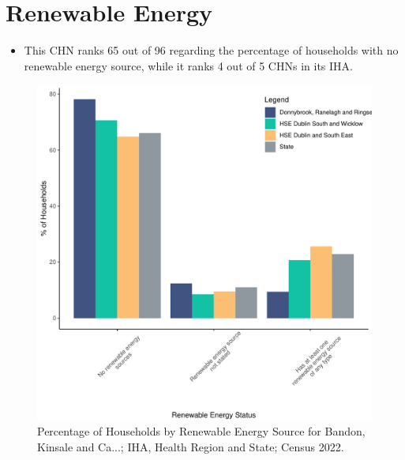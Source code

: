\documentclass{article}
\begin{document}
\section{Renewable Energy}\label{sect:RE}
\begin{itemize}
\item This CHN ranks  65 out of 96 regarding the percentage of households with no renewable energy source, while it ranks   4 out of 5 CHNs in its IHA.
\end{itemize}
\begin{figure}[H]
	\centering
	\includegraphics[width = 140mm]{../figures/RenewableEnergyED.pdf}
	\caption{Percentage of Households by Renewable Energy Source for Bandon, Kinsale and Ca...; IHA, Health Region and State; Census 2022.}
	\label{fig:vbnv}
	\end{figure}
\end{document}
